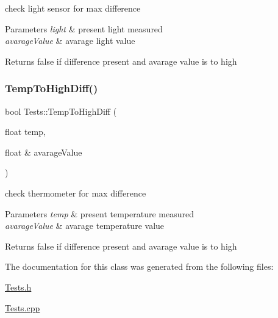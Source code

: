 check light sensor for max difference 


\begin{DoxyParams}{Parameters}
{\em light} & present light measured \\
\hline
{\em avarage\+Value} & avarage light value \\
\hline
\end{DoxyParams}
\begin{DoxyReturn}{Returns}
false if difference present and avarage value is to high 
\end{DoxyReturn}
\mbox{\label{class_tests_aaa57adb084c84b341dcdaee8bf13565a}} 
\subsubsection{\texorpdfstring{Temp\+To\+High\+Diff()}{TempToHighDiff()}}
{\footnotesize\ttfamily bool Tests\+::\+Temp\+To\+High\+Diff (\begin{DoxyParamCaption}\item[{float}]{temp,  }\item[{float \&}]{avarage\+Value }\end{DoxyParamCaption})}



check thermometer for max difference 


\begin{DoxyParams}{Parameters}
{\em temp} & present temperature measured \\
\hline
{\em avarage\+Value} & avarage temperature value \\
\hline
\end{DoxyParams}
\begin{DoxyReturn}{Returns}
false if difference present and avarage value is to high 
\end{DoxyReturn}


The documentation for this class was generated from the following files\+:\begin{DoxyCompactItemize}
\item 
\hyperlink{_tests_8h}{Tests.\+h}\item 
\hyperlink{_tests_8cpp}{Tests.\+cpp}\end{DoxyCompactItemize}

